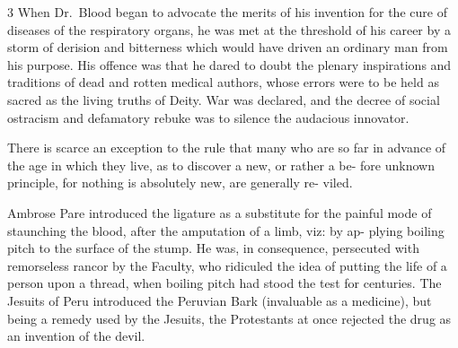 \documentclass[10pt]{article}
\begin{document}
\begin{multicols}{3}
	When Dr.~Blood began to advocate the merits of his invention for the\linebreak
	cure of diseases of the respiratory organs, he was met at the
	threshold of his\linebreak
	career by a storm of derision and bitterness which would have driven
	an\linebreak
	ordinary man from his purpose. His offence was that he dared to doubt\linebreak
	the plenary inspirations and traditions of dead and rotten medical
	authors,\linebreak
	whose errors were to be held as sacred as the living truths of
	Deity. War\linebreak
	was declared, and the decree of social ostracism and defamatory
	rebuke was\linebreak
	to silence the audacious innovator.\columnbreak

	There is scarce an exception to the rule that many who are so far in\linebreak
	advance of the age in which they live, as to discover a new, or
	rather a be-\linebreak
	fore unknown principle, for nothing is absolutely new, are generally
	re-\linebreak
	viled.

	Ambrose Pare introduced the ligature as a substitute for the painful\linebreak
	mode of staunching the blood, after the amputation of a limb, viz:
	by ap-\linebreak
	plying boiling pitch to the surface of the stump. He was, in
	consequence,\linebreak
	persecuted with remorseless rancor by the Faculty, who ridiculed the
	idea\linebreak
	of putting the life of a person upon a thread, when boiling pitch
	had stood\linebreak
	the test for centuries. The Jesuits of Peru introduced the Peruvian\linebreak
	Bark (invaluable as a medicine), but being a remedy used by the
	Jesuits,\linebreak
	the Protestants at once rejected the drug as an invention of the devil.

	\vspace{5mm}


\end{multicols}
\end{document}
